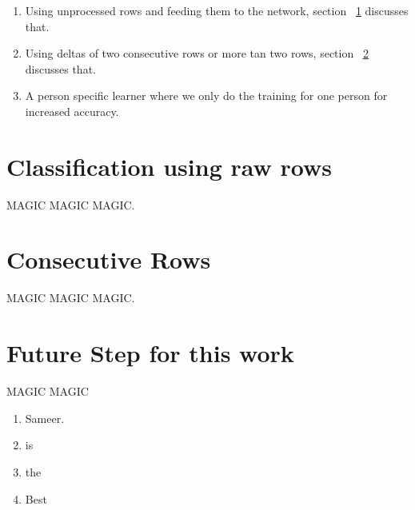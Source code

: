 \documentclass{article}
\begin{document}
\begin{enumerate}
  \item Using unprocessed rows and feeding them to the network, section ~\ref{simple_rows} discusses that.
  \item Using deltas of two consecutive  rows or more tan two rows, section ~\ref{consecutive_rows} discusses that. 
  \item A person specific learner where we only do the training for one person  for increased accuracy. 
\end{enumerate}  

\section{Classification using raw rows}
\label{simple_rows}
MAGIC MAGIC MAGIC.


\section{Consecutive Rows}
\label{consecutive_rows}
MAGIC MAGIC MAGIC.



\section{Future Step for this work}
MAGIC MAGIC 

\begin{enumerate}
  \item Sameer.  
  \item is  
  \item the 
  \item Best
\end{enumerate}

{}

\end{document}
